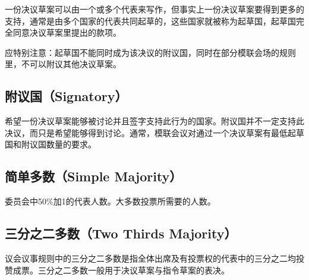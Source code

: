 \documentclass[a4paper,openany]{book}
\begin{document}
一份决议草案可以由一个或多个代表来写作，但事实上一份决议草案要得到更多的支持，通常是由多个国家的代表共同起草的，这些国家就被称为起草国，起草国完全同意决议草案里提出的款项。

应特别注意：起草国不能同时成为该决议的附议国，同时在部分模联会场的规则里，不可以附议其他决议草案。

\subsection*{附议国（Signatory）}

希望一份决议草案能够被讨论并且签字支持此行为的国家。附议国并不一定支持此决议，而只是希望能够得到讨论。通常，模联会议对通过一个决议草案有最低起草国和附议国数量的要求。

\subsection*{简单多数（Simple Majority）}

委员会中50\%加1的代表人数。大多数投票所需要的人数。

\subsection*{三分之二多数（Two Thirds Majority）}

议会议事规则中的三分之二多数是指全体出席及有投票权的代表中的三分之二均投赞成票。三分之二多数一般用于决议草案与指令草案的表决。

\end{document}
